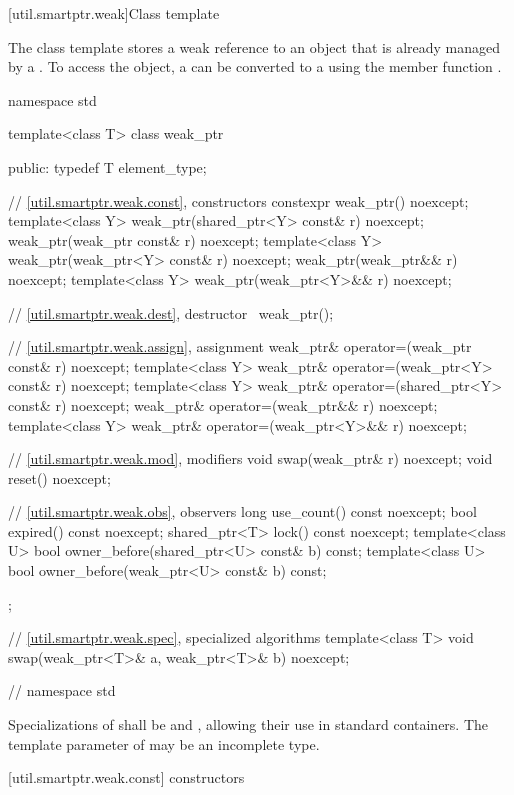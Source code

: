 [util.smartptr.weak]{Class template }

\pnum
{}%
The  class template stores a weak reference to an object
that is already managed by a . To access the object, a
 can be converted to a  using the member
function .

\begin{codeblock}
namespace std {
  template<class T> class weak_ptr {
  public:
    typedef T element_type;

    // \ref{util.smartptr.weak.const}, constructors
    constexpr weak_ptr() noexcept;
    template<class Y> weak_ptr(shared_ptr<Y> const& r) noexcept;
    weak_ptr(weak_ptr const& r) noexcept;
    template<class Y> weak_ptr(weak_ptr<Y> const& r) noexcept;
    weak_ptr(weak_ptr&& r) noexcept;
    template<class Y> weak_ptr(weak_ptr<Y>&& r) noexcept;

    // \ref{util.smartptr.weak.dest}, destructor
    ~weak_ptr();

    // \ref{util.smartptr.weak.assign}, assignment
    weak_ptr& operator=(weak_ptr const& r) noexcept;
    template<class Y> weak_ptr& operator=(weak_ptr<Y> const& r) noexcept;
    template<class Y> weak_ptr& operator=(shared_ptr<Y> const& r) noexcept;
    weak_ptr& operator=(weak_ptr&& r) noexcept;
    template<class Y> weak_ptr& operator=(weak_ptr<Y>&& r) noexcept;    

    // \ref{util.smartptr.weak.mod}, modifiers
    void swap(weak_ptr& r) noexcept;
    void reset() noexcept;

    // \ref{util.smartptr.weak.obs}, observers
    long use_count() const noexcept;
    bool expired() const noexcept;
    shared_ptr<T> lock() const noexcept;
    template<class U> bool owner_before(shared_ptr<U> const& b) const;
    template<class U> bool owner_before(weak_ptr<U> const& b) const;
  };

  // \ref{util.smartptr.weak.spec}, specialized algorithms
  template<class T> void swap(weak_ptr<T>& a, weak_ptr<T>& b) noexcept;
} // namespace std
\end{codeblock}

\pnum
Specializations of  shall be  and
, allowing their use in standard
containers.  The template parameter  of  may be an
incomplete type.

[util.smartptr.weak.const]{ constructors}

